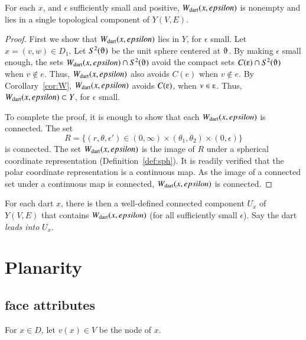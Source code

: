 \begin{lemma} 
For each $x$, and $\epsilon$ sufficiently small and positive,
$W_{\text{dart}}(x,epsilon)$ is nonempty and lies in a single 
topological component of $Y(V,E)$.
\end{lemma}

\begin{proof}  First we show that $W_{\text{dart}}(x,epsilon)$ lies in $Y$,
for $\epsilon$ small.  Let $x=(v,w)\in D_1$.  
Let $S^2(\orgn)$ be the unit sphere centered at $\orgn$.
By making $\epsilon$ small enough,
the sets $\Wdart(x,\epsilon)\cap S^2(\orgn)$
avoid the compact sets $C(\e)\cap S^2(\orgn)$ when $v\not\in e$.
Thus, $W_{\text{dart}}(x,epsilon)$ also avoids $C(e)$ when $v\not\in e$.
By Corollary~\ref{cor:W}, $W_{\text{dart}}(x,epsilon)$ avoids $C(\e)$, when $v\in \e$.
Thus, $W_{\text{dart}}(x,epsilon)\subset Y$, for $\epsilon$ small.

To complete the proof, it is enough to show that each $W_{\text{dart}}(x,epsilon)$ is
connected.  
The  set
   $$
   R=\{(r,\theta,\epsilon') \in (0,\infty) \times (\theta_1,\theta_2) \times (0,\epsilon)\}
   $$
is connected.
The set $W_{\text{dart}}(x,epsilon)$  is the image of $R$
under a spherical coordinate representation (Definition~\ref{def:sph}).
It is readily verified that the polar coordinate representation is
a continuous map. As the image of a connected set under a continuous map
is connected, $W_{\text{dart}}(x,epsilon)$ is connected.
\end{proof}

\begin{definition} For each dart $x$, 
there is then a well-defined connected
component $U_x$ of $Y(V,E)$ 
that contains $W_{\text{dart}}(x,epsilon)$ (for all
sufficiently small $\epsilon$). Say the dart {\it leads into}
$U_x$.
\end{definition}


\section{Planarity}


\subsection{face attributes}

For $x\in D$, let $v(x)\in V$ be the node of $x$.

